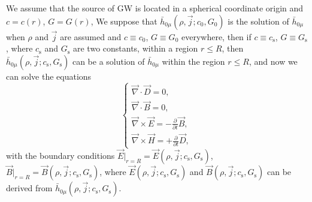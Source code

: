 \documentclass{article}
\def\p{\partial}
\begin{document}
We assume that the source of GW is located in a spherical coordinate origin and $c=c(r)$, $G=G(r)$, We suppose that $\bar{h}_{0 \mu}(\rho,\vec{j};c_0,G_0)$ is the solution of $\bar{h}_{0 \mu}$ when $\rho$ and $\vec{j}$ are assumed and $c\equiv c_0$, $G\equiv G_0$ everywhere, then if $c\equiv c_\text{s}$, $G\equiv G_\text{s}$, where $c_\text{s}$ and $G_\text{s}$ are two constants, within a region $r\leq R$, then $\bar{h}_{0 \mu}(\rho,\vec{j};c_\text{s},G_\text{s})$ can be a solution of $\bar{h}_{0 \mu}$ within the region $r\leq R$, and now we can solve the equations
\begin{equation}\label{maxwell_sf}
    \begin{cases}
        \vec{\nabla}\cdot\vec{D}=0,\\
        \vec{\nabla}\cdot\vec{B}=0,\\
        \vec{\nabla}\times\vec{E}=-\frac{\p}{\p t}\vec{B},\\
        \vec{\nabla}\times\vec{H}=+\frac{\p}{\p t}\vec{D},
    \end{cases}
\end{equation}
with the boundary conditions $\vec{E}|_{r=R}=\vec{E}(\rho,\vec{j};c_\text{s},G_\text{s})$, $\vec{B}|_{r=R}=\vec{B}(\rho,\vec{j};c_\text{s},G_\text{s})$, where $\vec{E}(\rho,\vec{j};c_\text{s},G_\text{s})$ and $\vec{B}(\rho,\vec{j};c_\text{s},G_\text{s})$ can be derived from $\bar{h}_{0 \mu}(\rho,\vec{j};c_\text{s},G_\text{s})$.
\end{document}
